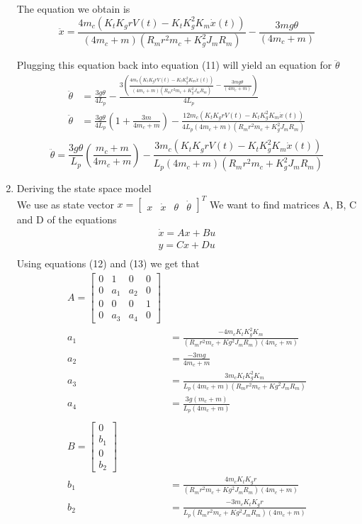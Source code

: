 \documentclass[11pt, twoside, letterpaper]{article}   	%
\begin{document}
\begin{enumerate}
The equation we obtain is
\begin{equation}
\ddot{x} = \frac{4m_c(K_tK_gr V(t)-K_tK_g^2K_m \dot{x}(t))}{(4m_c+m)(R_mr^2m_c+K_g^2J_mR_m)}-\frac{3mg\theta}{(4m_c+m)}
\end{equation}

Plugging this equation back into equation (11) will yield an equation 
for $\ddot{\theta}$
\begin{align*}
\ddot{\theta} &= \frac{3g\theta}{4L_p}-\frac{3(\frac{4m_c(K_tK_gr V(t)-K_tK_g^2K_m \dot{x}(t))}{(4m_c+m)(R_mr^2m_c+K_g^2J_mR_m)}-\frac{3mg\theta}{(4m_c+m)})}{4L_p}\\
\ddot{\theta} &= \frac{3g\theta}{4L_p}(1+\frac{3m}{4m_c+m}) - \frac{12m_c(K_tK_gr V(t)-K_tK_g^2K_m \dot{x}(t))}{4L_p(4m_c+m)(R_mr^2m_c+K_g^2J_mR_m)}\\
\end{align*}
\begin{equation}
\ddot{\theta} = \frac{3g\theta}{L_p}(\frac{m_c+m}{4m_c+m}) - \frac{3m_c(K_tK_gr V(t)-K_tK_g^2K_m \dot{x}(t))}{L_p(4m_c+m)(R_mr^2m_c+K_g^2J_mR_m)}
\end{equation}

\item Deriving the state space model\\
We use as state vector $x=\begin{bmatrix} x &\dot{x} &\theta &\dot{\theta} \end{bmatrix}^T$
We want to find matrices A, B, C and D of the equations\\
\begin{align*}
\dot{x} = Ax + Bu\\
y = Cx + Du\\
\end{align*}
Using equations (12) and (13) we get that\\
\begin{align*}
A = 
\begin{bmatrix}
0 &1 &0 &0\\
0 &a_1 &a_2 &0\\
0 &0 &0 &1\\
0 &a_3 &a_4 &0
\end{bmatrix}\\
a_1 &= \frac{-4m_cK_tK_g^2K_m}{(R_mr^2m_c+Kg^2J_mR_m)(4m_c+m)}\\
a_2 &= \frac{-3mg}{4m_c+m}\\
a_3 &= \frac{3m_cK_tK_g^2K_m}{L_p(4m_c+m)(R_mr^2m_c+Kg^2J_mR_m)}\\
a_4 &= \frac{3g(m_c+m)}{L_p(4m_c+m)}\\
\\
B = 
\begin{bmatrix}
0\\ b_1\\ 0 \\ b_2
\end{bmatrix}\\
b_1 &= \frac{4m_cK_tK_gr}{(R_mr^2m_c+Kg^2J_mR_m)(4m_c+m)}\\
b_2 &= \frac{-3m_cK_tK_gr}{L_p(R_mr^2m_c+Kg^2J_mR_m)(4m_c+m)}
\end{align*}


\end{enumerate}
\end{document}
